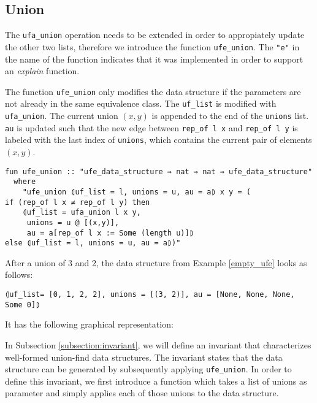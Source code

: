 \subsection{Union}

The \lstinline{ufa_union} operation needs to be extended in order to appropiately update the other two lists, therefore we introduce the function \lstinline{ufe_union}. The \lstinline|"e"| in the name of the function indicates that it was implemented in order to support an \emph{explain} function.

The function \lstinline{ufe_union} only modifies the data structure if the parameters are not already in the same equivalence class.
The \lstinline{uf_list} is modified with \lstinline{ufa_union}.
The current union $(x, y)$ is appended to the end of the \lstinline{unions} list.
\lstinline{au} is updated such that the new edge between \lstinline{rep_of l x} and \lstinline{rep_of l y} is labeled with the last index of \lstinline{unions}, which contains the current pair of elements $(x, y)$.

\begin{lstlisting}
fun ufe_union :: "ufe_data_structure ⇒ nat ⇒ nat ⇒ ufe_data_structure"
  where
    "ufe_union ⦇uf_list = l, unions = u, au = a⦈ x y = (
if (rep_of l x ≠ rep_of l y) then
    ⦇uf_list = ufa_union l x y,
     unions = u @ [(x,y)],
     au = a[rep_of l x := Some (length u)]⦈
else ⦇uf_list = l, unions = u, au = a⦈)"
\end{lstlisting}

\begin{exmp}
After a union of 3 and 2, the data structure from Example \ref{empty_ufe} looks as follows:
\begin{lstlisting}
⦇uf_list= [0, 1, 2, 2], unions = [(3, 2)], au = [None, None, None, Some 0]⦈
\end{lstlisting}
It has the following graphical representation:
\begin{center}
\end{center}

\end{exmp}

In Subsection \ref{subsection:invariant}, we will define an invariant that characterizes well-formed union-find data structures.
The invariant states that the data structure can be generated by subsequently applying \lstinline|ufe_union|.
In order to define this invariant, we first introduce a function which takes a list of unions as parameter and simply applies each of those unions to the data structure.

